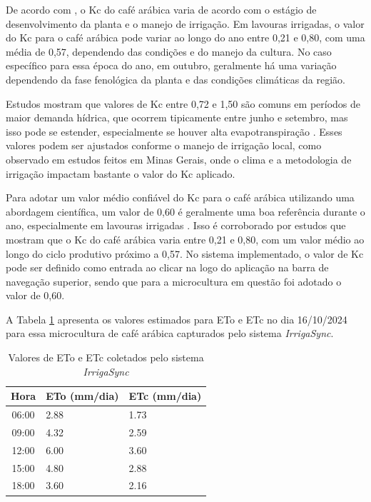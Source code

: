 De acordo com \textcite{rodrigues2013}, o Kc do café arábica varia de acordo com o estágio de desenvolvimento da planta e o manejo de irrigação. Em lavouras irrigadas, o valor do Kc para o café arábica pode variar ao longo do ano entre 0,21 e 0,80, com uma média de 0,57, dependendo das condições e do manejo da cultura.
No caso específico para essa época do ano, em outubro, geralmente há uma variação dependendo da fase fenológica da planta e das condições climáticas da região. 

Estudos mostram que valores de Kc entre 0,72 e 1,50 são comuns em períodos de maior demanda hídrica, que ocorrem tipicamente entre junho e setembro, mas isso pode se estender, especialmente se houver alta evapotranspiração \parencite{souza2005}. Esses valores podem ser ajustados conforme o manejo de irrigação local, como observado em estudos feitos em Minas Gerais, onde o clima e a metodologia de irrigação impactam bastante o valor do Kc aplicado.

Para adotar um valor médio confiável do Kc para o café arábica utilizando uma abordagem científica, um valor de 0,60 é geralmente uma boa referência durante o ano, especialmente em lavouras irrigadas \parencite{rodrigues2013}. Isso é corroborado por estudos que mostram que o Kc do café arábica varia entre 0,21 e 0,80, com um valor médio ao longo do ciclo produtivo próximo a 0,57. No sistema implementado, o valor de Kc pode ser definido como entrada ao clicar na logo do aplicação na barra de navegação superior, sendo que para a microcultura em questão foi adotado o valor de 0,60.

A Tabela \ref{tab:et} apresenta os valores estimados para ETo e ETc no dia 16/10/2024 para essa microcultura de café arábica capturados pelo sistema \textit{IrrigaSync}.

\begin{table}[!htb]
  \caption{Valores de ETo e ETc coletados pelo sistema \textit{IrrigaSync}} \label{tab:et}
  \begin{tabularx}{\textwidth}{|c|X|X|} \hline
    \textbf{Hora} & \textbf{ETo (mm/dia)} & \textbf{ETc (mm/dia)} \\ \hline
    06:00 & 2.88 & 1.73 \\ \hline
    09:00 & 4.32 & 2.59 \\ \hline
    12:00 & 6.00 & 3.60 \\ \hline
    15:00 & 4.80 & 2.88 \\ \hline
    18:00 & 3.60 & 2.16 \\ \hline
  \end{tabularx}
\end{table}

